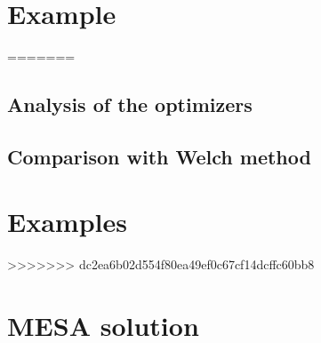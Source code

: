 \documentclass[twocolumn,showpacs,preprintnumbers,nofootinbib,prd,
superscriptaddress,10pt]{revtex4-1}
\begin{document}
\section{Example} 
=======
\subsection{Analysis of the optimizers}

\subsection{Comparison with Welch method}
 
\section{Examples} 



>>>>>>> dc2ea6b02d554f80ea49ef0c67cf14dcffc60bb8


\appendix
\section{MESA solution}
\end{document}
